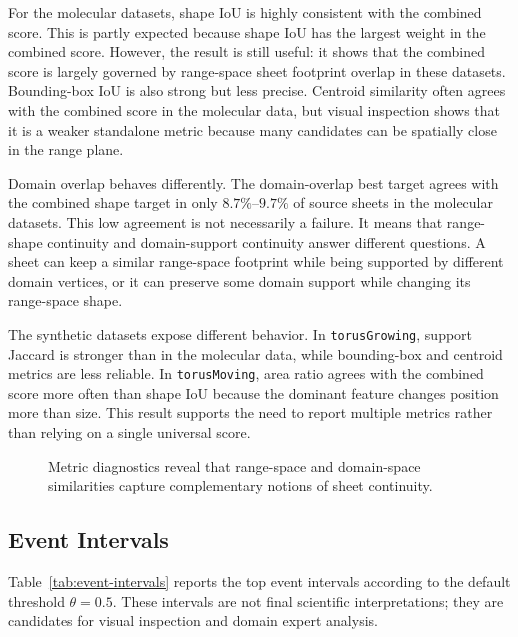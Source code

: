 For the molecular datasets, shape IoU is highly consistent with the combined
score. This is partly expected because shape IoU has the largest weight in the
combined score. However, the result is still useful: it shows that the combined
score is largely governed by range-space sheet footprint overlap in these
datasets. Bounding-box IoU is also strong but less precise. Centroid similarity
often agrees with the combined score in the molecular data, but visual
inspection shows that it is a weaker standalone metric because many candidates
can be spatially close in the range plane.

Domain overlap behaves differently. The domain-overlap best target agrees with
the combined shape target in only \(8.7\%\)--\(9.7\%\) of source sheets in the
molecular datasets. This low agreement is not necessarily a failure. It means
that range-shape continuity and domain-support continuity answer different
questions. A sheet can keep a similar range-space footprint while being
supported by different domain vertices, or it can preserve some domain support
while changing its range-space shape.

The synthetic datasets expose different behavior. In \texttt{torusGrowing},
support Jaccard is stronger than in the molecular data, while bounding-box and
centroid metrics are less reliable. In \texttt{torusMoving}, area ratio agrees
with the combined score more often than shape IoU because the dominant feature
changes position more than size. This result supports the need to report
multiple metrics rather than relying on a single universal score.

\begin{figure}[t]
  \caption{Metric diagnostics reveal that range-space and domain-space
  similarities capture complementary notions of sheet continuity.}
  \label{fig:metric-diagnostics}
\end{figure}

\subsection{Event Intervals}

Table~\ref{tab:event-intervals} reports the top event intervals according to
the default threshold \(\theta=0.5\). These intervals are not final scientific
interpretations; they are candidates for visual inspection and domain expert
analysis.

